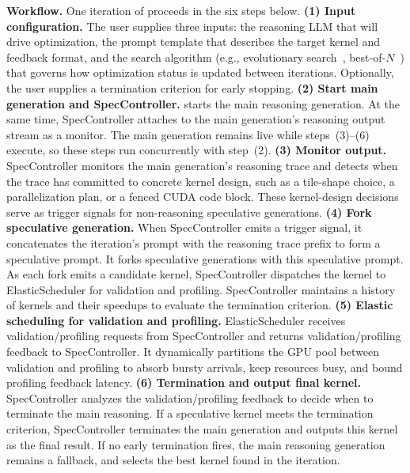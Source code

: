 \noindent\textbf{Workflow.}\label{subsec:workflow}
One iteration of \sysname{} proceeds in the six steps below.
\noindent\textbf{(1) Input configuration.}
The user supplies three inputs: the reasoning LLM that will drive optimization,
the prompt template that describes the target kernel and feedback format, and
the search algorithm
(e.g., evolutionary search~\cite{AlphaEvolve,kernelagent2025,openevolve},
best-of-$N$~\cite{K-Search,cudaforge,TritonForge})
that governs how optimization status is updated between iterations.
Optionally, the user supplies a termination criterion for early stopping.
\noindent\textbf{(2) Start main generation and SpecController.}
\sysname{} starts the main reasoning generation.
At the same time, SpecController attaches to the main generation's reasoning output stream as a monitor.
The main generation remains live while steps~(3)--(6) execute, so these steps run concurrently with step~(2).
\noindent\textbf{(3) Monitor output.}
SpecController monitors the main generation's reasoning trace and detects
when the trace has committed to concrete kernel design, such as a tile-shape
choice, a parallelization plan, or a fenced CUDA code block.
These kernel-design decisions serve as trigger signals for non-reasoning
speculative generations.
\noindent\textbf{(4) Fork speculative generation.}
When SpecController emits a trigger signal, it concatenates the iteration's prompt
with the reasoning trace prefix to form a speculative prompt.
It forks speculative generations with this speculative prompt.
As each fork emits a candidate kernel, SpecController dispatches the kernel to
ElasticScheduler for validation and profiling.
SpecController maintains a history of kernels and their speedups to evaluate
the termination criterion.
\noindent\textbf{(5) Elastic scheduling for validation and profiling.}
ElasticScheduler receives validation/profiling requests from SpecController
and returns validation/profiling feedback to SpecController.
It dynamically partitions the GPU pool between validation and profiling to
absorb bursty arrivals, keep resources busy, and bound profiling feedback
latency.
\noindent\textbf{(6) Termination and output final kernel.}
SpecController analyzes the validation/profiling feedback to decide when to terminate the main reasoning.
If a speculative kernel meets the termination criterion, SpecController terminates the main generation and outputs this kernel as the final result.
If no early termination fires, the main reasoning generation remains a fallback,
and \sysname{} selects the best kernel found in the iteration.

